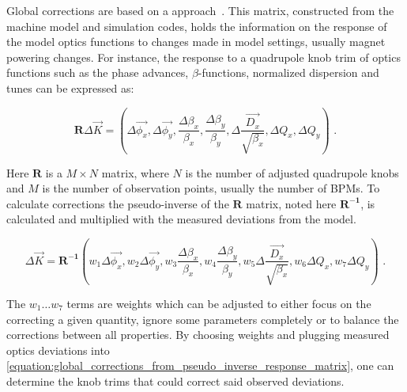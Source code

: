 Global corrections are based on a  approach~\cite{PHD:Vanbavinckhove,EPAC:Tomas:Procedures_Accuracy_Estimates_Beta_Beat_Correction_LHC}.
This matrix, constructed from the machine model and simulation codes, holds the information on the response of the model optics functions to changes made in model settings, usually magnet powering changes.
For instance, the response to a quadrupole \gls{knob} \gls{trim} of optics functions such as the phase advances, \(\beta\)-functions, normalized dispersion and tunes can be expressed as:

\begin{equation}
  \mathbf{R} \Delta \vec{K} = \left(\Delta \overrightarrow{\phi_x}, \Delta \overrightarrow{\phi_y}, \frac{\Delta \beta_x}{\beta_x}, \frac{\Delta \beta_y}{\beta_y}, \Delta \frac{\overrightarrow{D_x}}{\sqrt{\beta_x}}, \Delta Q_x, \Delta Q_y \right) \text{ .}
  \label{equation:response_matrix}
\end{equation}

Here \(\mathbf{R}\) is a \(M \times N\) matrix, where \(N\) is the number of adjusted quadrupole knobs and \(M\) is the number of observation points, usually the number of BPMs.
To calculate corrections the pseudo-inverse of the \(\mathbf{R}\) matrix, noted here \(\mathbf{R^{-1}}\), is calculated and multiplied with the measured deviations from the model.

\begin{equation}
  \Delta \vec{K} = \mathbf{R^{-1}} \left(w_1 \Delta \overrightarrow{\phi_x}, w_2 \Delta \overrightarrow{\phi_y}, w_3 \frac{\Delta \beta_x}{\beta_x}, w_4 \frac{\Delta \beta_y}{\beta_y}, w_5 \Delta \frac{\overrightarrow{D_x}}{\sqrt{\beta_x}}, w_6 \Delta Q_x, w_7 \Delta Q_y \right) \text{ .}
  \label{equation:global_corrections_from_pseudo_inverse_response_matrix}
\end{equation}

The \(w_1 \ldots w_7\) terms are weights which can be adjusted to either focus on the correcting a given quantity, ignore some parameters completely or to balance the corrections between all properties.
By choosing weights and plugging measured optics deviations into \cref{equation:global_corrections_from_pseudo_inverse_response_matrix}, one can determine the knob trims that could correct said observed deviations.

\glsresetall                                     %
